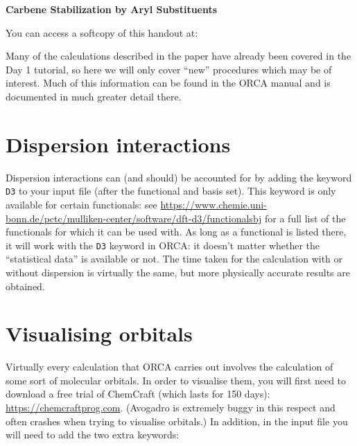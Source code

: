 \documentclass[10pt]{article}
\begin{document}

\textbf{\LARGE Carbene Stabilization by Aryl Substituents}

\vspace{0.5cm}

You can access a softcopy of this handout at:

\begin{center}
\end{center}

Many of the calculations described in the paper\autocite{Woodcock2007} have already been covered in the Day 1 tutorial, so here we will only cover ``new'' procedures which may be of interest. Much of this information can be found in the ORCA manual and is documented in much greater detail there.

\section{Dispersion interactions}

Dispersion interactions\autocite{Grimme2011} can (and should) be accounted for by adding the keyword \texttt{D3} to your input file (after the functional and basis set). This keyword is only available for certain functionals: see \url{https://www.chemie.uni-bonn.de/pctc/mulliken-center/software/dft-d3/functionalsbj} for a full list of the functionals for which it can be used with. As long as a functional is listed there, it will work with the \texttt{D3} keyword in ORCA: it doesn't matter whether the ``statistical data'' is available or not. The time taken for the calculation with or without dispersion is virtually the same, but more physically accurate results are obtained.

\section{Visualising orbitals}

Virtually every calculation that ORCA carries out involves the calculation of some sort of molecular orbitals. In order to visualise them, you will first need to download a free trial of ChemCraft (which lasts for 150 days): \url{https://chemcraftprog.com}. (Avogadro is extremely buggy in this respect and often crashes when trying to visualise orbitals.) In addition, in the input file you will need to add the two extra keywords:
\end{document}
